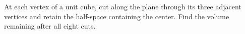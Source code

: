 At each vertex of a unit cube, cut along the plane through its three adjacent vertices and retain the half-space containing the center. Find the volume remaining after all eight cuts.
